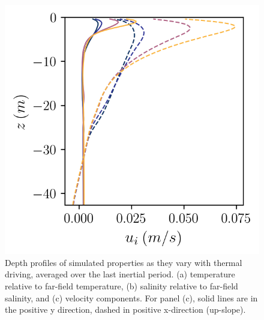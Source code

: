 \documentclass[draft]{agujournal2019}
\begin{document}
\begin{figure}[h!]
\begin{minipage}{0.33\textwidth}
    \end{minipage}%
    \begin{minipage}{0.33\textwidth}
        \includegraphics[trim={0 0 0 0},clip, width=\textwidth]{Figures/velocity_cmp_dT_43h_tav13h_z_profile.png}
    \end{minipage}
    \caption{Depth profiles of simulated properties as they vary with thermal driving, averaged over the last inertial period. (a) temperature relative to far-field temperature, (b) salinity relative to far-field salinity, and (c) velocity components. For panel (c), solid lines are in the positive y direction, dashed in positive x-direction (up-slope).}
    \label{fig:dT_profiles}
\end{figure}
\end{document}
